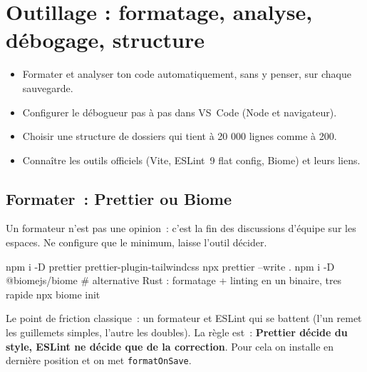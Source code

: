 \chapter{Outillage : formatage, analyse, d\'ebogage, structure}
\label{ch-js-outils}

\begin{objectif}
\begin{itemize}
  \item Formater et analyser ton code automatiquement, sans y penser, sur chaque sauvegarde.
  \item Configurer le d\'ebogueur pas \`a pas dans VS~Code (Node et navigateur).
  \item Choisir une structure de dossiers qui tient \`a 20 000 lignes comme \`a 200.
  \item Conna\^itre les outils officiels (Vite, ESLint~9 flat config, Biome) et leurs liens.
\end{itemize}
\end{objectif}

\section{Formater~: Prettier ou Biome}

Un formateur n'est pas une opinion~: c'est la fin des discussions d'\'equipe sur les espaces.
Ne configure que le minimum, laisse l'outil d\'ecider.

\begin{terminal}
npm i -D prettier prettier-plugin-tailwindcss
npx prettier --write .
npm i -D @biomejs/biome          # alternative Rust : formatage + linting en un binaire, tres rapide
npx biome init
\end{terminal}


\begin{note}
Le point de friction classique~: un formateur et ESLint qui se battent (l'un remet les guillemets
simples, l'autre les doubles). La r\`egle est~: \textbf{Prettier d\'ecide du style, ESLint ne d\'ecide
que de la correction}. Pour cela on installe
 en derni\`ere
position et on met \verb|formatOnSave|.
\end{note}

